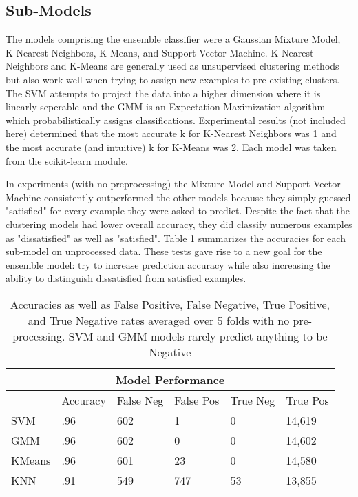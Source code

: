 \documentclass[11pt]{article}
\begin{document}
\subsection{Sub-Models}
The models comprising the ensemble classifier were a Gaussian Mixture Model, 
K-Nearest Neighbors, K-Means, and Support Vector Machine. K-Nearest Neighbors 
and K-Means are generally used as unsupervised clustering methods but also 
work well when trying to assign new examples to pre-existing clusters. The 
SVM attempts to project the data into a higher dimension where it is linearly 
seperable and the GMM is an Expectation-Maximization algorithm which 
probabilistically assigns classifications. Experimental results (not included 
here) determined that the most accurate k for K-Nearest Neighbors was 1 and 
the most accurate (and intuitive) k for K-Means was 2. Each model was taken 
from the scikit-learn module.

In experiments (with no preprocessing) the Mixture Model and Support Vector 
Machine consistently outperformed the other models because they simply guessed 
"satisfied" for every example they were asked to predict. Despite the fact 
that the clustering models had lower overall accuracy, they did classify 
numerous examples as "dissatisfied" as well as "satisfied". Table 
\ref{table:models} summarizes the accuracies for each sub-model on unprocessed 
data. These tests gave rise to a new goal for the ensemble model: try to 
increase prediction accuracy while also increasing the ability to distinguish 
dissatisfied from satisfied examples.

\begin{table}
    \captionsetup{width=0.8\textwidth}
    \centering
    \begin{tabular}{ |p{2cm}|p{2cm}|p{2cm}|p{2cm}|p{2cm}|p{2cm}|  }
    \hline
        \multicolumn{6}{|c|}{Model Performance} \\
    \hline
        & Accuracy & False Neg & False Pos & True Neg & True Pos \\
    \hline
        SVM    & .96 & 602 & 1 & 0 & 14,619 \\
        GMM    & .96 & 602 & 0 & 0 & 14,602 \\
        KMeans & .96 & 601 & 23 & 0 & 14,580 \\
        KNN    & .91 & 549 & 747 & 53 & 13,855 \\
    \hline
    \end{tabular}
    \caption{Accuracies as well as False Positive, False Negative, True 
    Positive, and True Negative rates averaged over 5 folds with no pre-
    processing. SVM and GMM models rarely predict anything to be Negative}
    \label{table:models}
\end{table}
\end{document}
